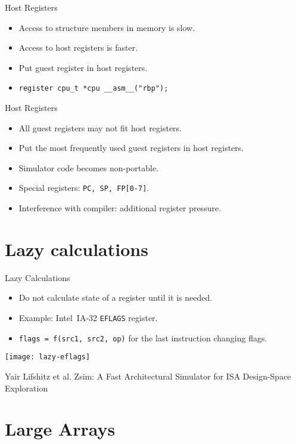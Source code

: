 \begin{frame}{Host Registers}
\begin{itemize}
\item Access to structure members in memory is slow.
\item Access to host registers is faster.
\item Put guest register in host registers.
\item \texttt{register cpu_t *cpu __asm__("rbp");}
\end{itemize}
\end{frame}

\begin{frame}{Host Registers}
\begin{itemize}
\item All guest registers may not fit host registers.
\item Put the most frequently used guest registers in host registers.
\item Simulator code becomes non-portable.
\item Special registers: \texttt{PC, SP, FP[0-7]}.
\item Interference with compiler: additional register pressure.
\end{itemize}
\end{frame}

\section{Lazy calculations}

\begin{frame}{Lazy Calculations}
\begin{itemize}
\item Do not calculate state of a register until it is needed.
\item Example: Intel\reg~IA-32 \texttt{EFLAGS} register.
\item \texttt{flags = f(src1, src2, op)} for the last instruction changing flags.
\end{itemize}
\vfill
\centering
\texttt{[image: lazy-eflags]}

\tiny{Yair Lifshitz et al. Zsim: A Fast Architectural Simulator for ISA Design-Space Exploration}
\end{frame}

\section{Large Arrays}


